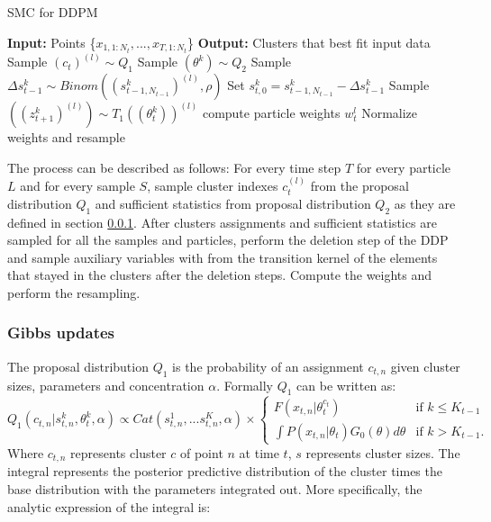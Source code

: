 \documentclass[twoside,hidelinks]{article}
\begin{document}
\begin{algorithm}[ht!]
  \caption{SMC for DDPM}\label{SMC}
  \begin{algorithmic}[1]
	\State \textbf{Input:} Points \{$x_{1,1:N_t}, ..., x_{T,1:N_t}$\}
	\State \textbf{Output:} Clusters that best fit input data
								\State Sample $(c_t)^{(l)} \sim Q_1$  
								\State Sample $(\theta^k ) \sim Q_2$
						    \EndFor		
			   \State Sample $\Delta s_{t-1}^k \sim Binom( (s_{t-1,N_{t-1}}^k)^{(l)}, \rho) $ 
		       \State Set $s_{t,0}^{k} = s_{t-1,N_{t-1}}^{k} -\Delta s_{t-1}^k$
   		       \State Sample $( (z_{t+1}^k)^{(l)} ) \sim T_1((\theta_t^k))^{(l)} $
		    \EndFor
		 	\State compute particle weights $w_t^l$
		    \EndFor
    \State Normalize weights and resample
    \EndFor
  \end{algorithmic}
\end{algorithm}

The process can be described as follows:
For every time step $T$ for every particle $L$ and for every sample $S$, sample cluster indexes $c_t^{(l)}$ from the proposal distribution $Q_1$ and sufficient statistics from proposal distribution $Q_2$ as they are defined in section \ref{gibbsUpd}. After clusters assignments and sufficient statistics are sampled for all the samples and particles, perform the deletion step of the DDP and sample auxiliary variables with from the transition kernel of the elements that stayed in the clusters after the deletion steps. Compute the weights and perform the resampling. 

\subsubsection{Gibbs updates}
\label{gibbsUpd}
The proposal distribution $Q_1$ is the probability of an assignment $c_{t,n}$ given cluster sizes, parameters and concentration $\alpha$. Formally $Q_1$ can be written as:
\begin{equation} \label{Gibbs}
 Q_1(c_{t,n} | s_{t,n}^k, \theta_t^k, \alpha) \propto Cat( s_{t,n}^1,...s_{t,n}^K, \alpha ) \times
 	\begin{cases} 
 	F(x_{t,n} | \theta_t^{c_t} )  &\mbox{if } k \leq K_{t-1} \\
 	\int P(x_{t,n} | \theta_t )G_0(\theta) d\theta & \mbox{if } k > K_{t-1}. \end{cases}
\end{equation}
Where $c_{t,n}$ represents cluster $c$ of point $n$ at time $t$, $s$ represents cluster sizes. The integral represents the posterior predictive distribution of the cluster times the base distribution with the parameters integrated out. More specifically, the analytic expression of the integral is:
\end{document}
